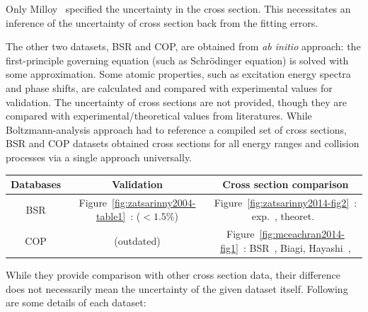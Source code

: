 \documentclass[11pt]{article}
\begin{document}
Only Milloy~\cite{Milloy1977} specified the uncertainty in the cross section.
This necessitates an inference of the uncertainty of cross section back from the fitting errors.
\par
The other two datasets, BSR and COP, are obtained from \textit{ab initio} approach:
the first-principle governing equation (such as Schr\"{o}dinger equation)
is solved with some approximation.
Some atomic properties, such as excitation energy spectra and phase shifts,
are calculated and compared with experimental values for validation.
The uncertainty of cross sections are not provided, though they are compared with experimental/theoretical values from literatures.
While Boltzmann-analysis approach had to reference a compiled set of cross sections,
BSR and COP datasets obtained cross sections for all energy ranges and collision processes
via a single approach universally.\\
\begin{tabular}{|c|c|c|}
\hline
Databases & Validation & Cross section comparison \\
\hline
BSR & Figure~\ref{fig:zatsarinny2004-table1}~\cite{Zatsarinny2004}: \cite{Moore1971} ($<1.5\%$) & Figure~\ref{fig:zatsarinny2014-fig2}~\cite{Zatsarinny2014}: exp.~\cite{Srivastava1981,Gibson1996,Mielewska2004,Frost1964,Nakamura1988,Panajotovic1997},
theoret.~\cite{McEachran1983,Mceachran1997,Dasgupta1985,Bell1984}\\
\hline
COP & \cite[Fig 1-4]{McEachran1983} (outdated) & Figure~\ref{fig:mceachran2014-fig1}~\cite{Mceachran2014}: BSR~\cite{Zatsarinny2004, Allan2006}, Biagi, Hayashi~\cite{Hayashi2003}, \cite{Buckman2000} \\
\hline
\end{tabular}
While they provide comparison with other cross section data,
their difference does not necessarily mean the uncertainty of the given dataset itself.
Following are some details of each dataset:
\end{document}
